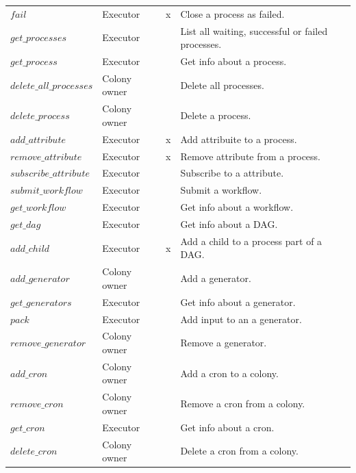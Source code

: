 \documentclass{article}
\begin{document}
\begin{table}[h]
\begin{tabular}{llcl}
        \(fail\)                   & Executor     & x          & Close a process as failed. \\
        \(get\_processes\)         & Executor     &            & List all waiting, successful or failed processes. \\
        \(get\_process\)           & Executor     &            & Get info about a process. \\
        \(delete\_all\_processes\) & Colony owner &            & Delete all processes. \\
        \(delete\_process\)        & Colony owner &            & Delete a process. \\
        \(add\_attribute\)         & Executor     & x          & Add attribuite to a process. \\
        \(remove\_attribute\)      & Executor     & x          & Remove attribute from a process. \\
        \(subscribe\_attribute\)   & Executor     &            & Subscribe to a attribute. \\
        \(submit\_workflow\)       & Executor     &            & Submit a workflow. \\
        \(get\_workflow\)          & Executor     &            & Get info about a workflow. \\
        \(get\_dag\)               & Executor     &            & Get info about a DAG. \\
        \(add\_child\)             & Executor     & x          & Add a child to a process part of a DAG. \\
        \(add\_generator\)         & Colony owner &            & Add a generator. \\
        \(get\_generators\)        & Executor     &            & Get info about a generator. \\
        \(pack\)                   & Executor     &            & Add input to an a generator. \\
        \(remove\_generator\)      & Colony owner &            & Remove a generator. \\
        \(add\_cron\)              & Colony owner &            & Add a cron to a colony.\\
        \(remove\_cron\)           & Colony owner &            & Remove a cron from a colony.\\
        \(get\_cron\)              & Executor     &            & Get info about a cron. \\
        \(delete\_cron\)           & Colony owner &            & Delete a cron from a colony.\\

\end{tabular}
\end{table}
\end{document}
